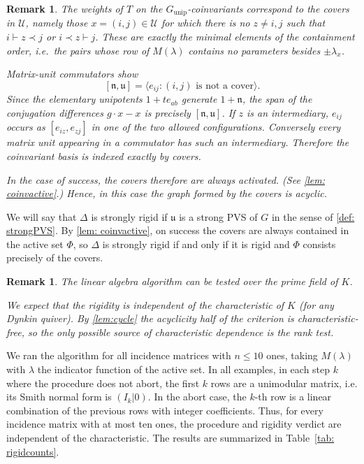 \documentclass[12pt]{article}
\newtheorem{remark}[theorem]{Remark}
\newcommand{\uu}{\mathfrak{u}}
\newcommand{\nn}{\mathfrak{n}}
\newcommand{\U}{\mathcal{U}}
\newcommand{\rad}[1]{#1_{\operatorname{unip}}}
\newcommand{\IM}{\Delta}
\newcommand{\homr}{\vdash}
\newcommand{\extr}{\prec}
\newcommand{\PVS}{PVS}
\begin{document}
\begin{remark} \label{rem: covers}
The weights of $T$ on the $\rad{G}$-coinvariants correspond to the \emph{covers} in $\U$,
namely those $x=(i,j)\in\U$ for which there is no $z\ne i,j$ such that
$i\homr z\extr j$ or $i\extr z\homr j$.
These are exactly the minimal elements of the containment order, i.e.\ the pairs whose row of
$M(\lambda)$ contains no parameters besides $\pm\lambda_x$.

Matrix-unit commutators show
\[
 [\nn,\uu]=\langle e_{ij}:(i,j)\text{ is not a cover}\rangle.
\]
Since the elementary unipotents $1+t e_{ab}$ generate $1+\mathfrak n$, the span of the conjugation differences $g\cdot x-x$ is precisely $[\mathfrak n,\mathfrak u]$.
If $z$ is an intermediary, $e_{ij}$ occurs as $[e_{iz},e_{zj}]$ in one of the two allowed
configurations.  Conversely every matrix unit appearing in a commutator has such an
intermediary.  Therefore the coinvariant basis is indexed exactly by covers.

In the case of success, the covers therefore are always activated. (See \cref{lem: coinvactive}.)
Hence, in this case the graph formed by the covers is acyclic.
\end{remark}

We will say that $\IM$ is strongly rigid if $\uu$ is a strong {\PVS} of $G$ in the sense of \cref{def: strongPVS}.
By \cref{lem: coinvactive}, on success the covers are always contained in the active set $\Phi$,
so $\IM$ is strongly rigid if and only if it is rigid and $\Phi$ consists precisely of the covers.



\begin{remark} \label{rem: anyfield}
The linear algebra algorithm can be tested over the prime field of $K$.

We expect that the rigidity is independent of the characteristic of $K$ (for any Dynkin quiver).
By \cref{lem:cycle} the acyclicity half of the criterion is characteristic-free, so the only possible source of
characteristic dependence is the rank test.
\end{remark}

We ran the algorithm for all incidence matrices with $n\le10$ ones, taking $M(\lambda)$ with $\lambda$ the indicator function of
the active set.
In all examples, in each step $k$ where the procedure does not abort, the first $k$ rows are a unimodular matrix, i.e.
its Smith normal form is $(I_k|0)$.
In the abort case, the $k$-th row is a linear combination of the previous rows with integer coefficients.
Thus, for every incidence matrix with at most ten ones, the procedure and rigidity verdict are independent of the characteristic.
The results are summarized in Table~\ref{tab: rigidcounts}.
\end{document}

